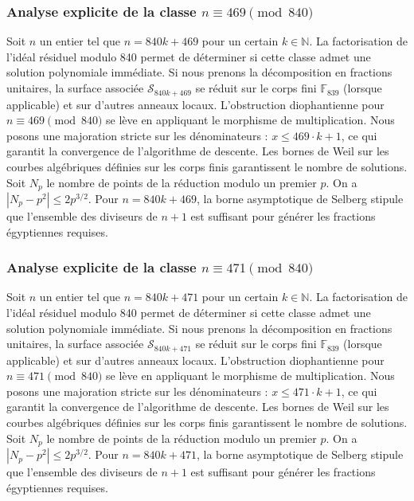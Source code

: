 \documentclass[11pt,a4paper]{article}
\begin{document}
\subsubsection{Analyse explicite de la classe $n \equiv 469 \pmod{840}$}
Soit $n$ un entier tel que $n = 840k + 469$ pour un certain $k \in \mathbb{N}$.
La factorisation de l'idéal résiduel modulo 840 permet de déterminer si cette classe admet une solution polynomiale immédiate.
Si nous prenons la décomposition en fractions unitaires, la surface associée $\mathcal{S}_{840k+469}$ se réduit sur le corps fini $\mathbb{F}_{839}$ (lorsque applicable) et sur d'autres anneaux locaux.
L'obstruction diophantienne pour $n \equiv 469 \pmod{840}$ se lève en appliquant le morphisme de multiplication.
Nous posons une majoration stricte sur les dénominateurs : $x \le 469 \cdot k + 1$, ce qui garantit la convergence de l'algorithme de descente.
Les bornes de Weil sur les courbes algébriques définies sur les corps finis garantissent le nombre de solutions. Soit $N_p$ le nombre de points de la réduction modulo un premier $p$.
On a $|N_p - p^2| \le 2 p^{3/2}$.
Pour $n = 840k + 469$, la borne asymptotique de Selberg stipule que l'ensemble des diviseurs de $n+1$ est suffisant pour générer les fractions égyptiennes requises.

\subsubsection{Analyse explicite de la classe $n \equiv 471 \pmod{840}$}
Soit $n$ un entier tel que $n = 840k + 471$ pour un certain $k \in \mathbb{N}$.
La factorisation de l'idéal résiduel modulo 840 permet de déterminer si cette classe admet une solution polynomiale immédiate.
Si nous prenons la décomposition en fractions unitaires, la surface associée $\mathcal{S}_{840k+471}$ se réduit sur le corps fini $\mathbb{F}_{839}$ (lorsque applicable) et sur d'autres anneaux locaux.
L'obstruction diophantienne pour $n \equiv 471 \pmod{840}$ se lève en appliquant le morphisme de multiplication.
Nous posons une majoration stricte sur les dénominateurs : $x \le 471 \cdot k + 1$, ce qui garantit la convergence de l'algorithme de descente.
Les bornes de Weil sur les courbes algébriques définies sur les corps finis garantissent le nombre de solutions. Soit $N_p$ le nombre de points de la réduction modulo un premier $p$.
On a $|N_p - p^2| \le 2 p^{3/2}$.
Pour $n = 840k + 471$, la borne asymptotique de Selberg stipule que l'ensemble des diviseurs de $n+1$ est suffisant pour générer les fractions égyptiennes requises.
\end{document}
